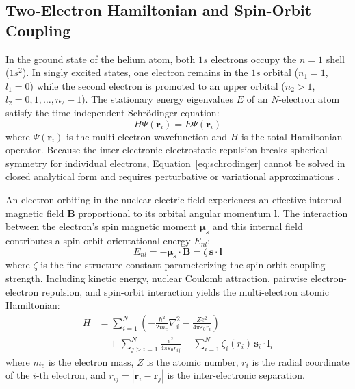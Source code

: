 \documentclass[journal]{IEEEtran}
\begin{document}
\subsection{Two-Electron Hamiltonian and Spin-Orbit Coupling}
In the ground state of the helium atom, both $1s$ electrons occupy the $n = 1$ shell ($1s^2$). In singly excited states, one electron remains in the $1s$ orbital ($n_1 = 1$, $l_1 = 0$) while the second electron is promoted to an upper orbital ($n_2 > 1$, $l_2 = 0, 1, \dots, n_2 - 1$). The stationary energy eigenvalues $E$ of an $N$-electron atom satisfy the time-independent Schr\"odinger equation:
\begin{equation}
    H \Psi(\mathbf{r}_i) = E \Psi(\mathbf{r}_i)
    \label{eq:schrodinger}
\end{equation}
where $\Psi(\mathbf{r}_i)$ is the multi-electron wavefunction and $H$ is the total Hamiltonian operator. Because the inter-electronic electrostatic repulsion breaks spherical symmetry for individual electrons, Equation~\eqref{eq:schrodinger} cannot be solved in closed analytical form and requires perturbative or variational approximations \cite{lab_manual}.

An electron orbiting in the nuclear electric field experiences an effective internal magnetic field $\mathbf{B}$ proportional to its orbital angular momentum $\mathbf{l}$. The interaction between the electron's spin magnetic moment $\boldsymbol{\mu}_s$ and this internal field contributes a spin-orbit orientational energy $E_{nl}$:
\begin{equation}
    E_{nl} = -\boldsymbol{\mu}_s \cdot \mathbf{B} = \zeta\,\mathbf{s} \cdot \mathbf{l}
    \label{eq:spin_orbit}
\end{equation}
where $\zeta$ is the fine-structure constant parameterizing the spin-orbit coupling strength. Including kinetic energy, nuclear Coulomb attraction, pairwise electron-electron repulsion, and spin-orbit interaction yields the multi-electron atomic Hamiltonian:
\begin{equation}
\begin{aligned}
    H &= \sum_{i=1}^{N} \left(-\frac{\hbar^2}{2 m_e} \nabla_i^2 - \frac{Z e^2}{4 \pi \varepsilon_0 r_i}\right) \\
      &\quad + \sum_{j > i = 1}^{N} \frac{e^2}{4 \pi \varepsilon_0 r_{ij}} + \sum_{i=1}^{N} \zeta_i(r_i)\,\mathbf{s}_i \cdot \mathbf{l}_i
\end{aligned}
    \label{eq:hamiltonian}
\end{equation}
where $m_e$ is the electron mass, $Z$ is the atomic number, $r_i$ is the radial coordinate of the $i$-th electron, and $r_{ij} = |\mathbf{r}_i - \mathbf{r}_j|$ is the inter-electronic separation.
\end{document}
